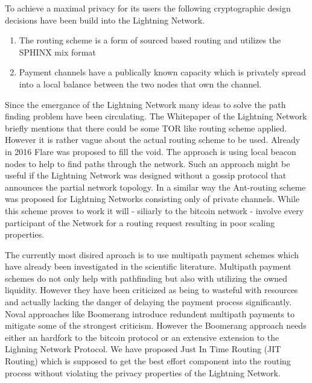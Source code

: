 \documentclass[a4paper,latin]{paper}
\begin{document}
To achieve a maximal privacy for its users the following cryptographic design decisions have been build into the Lightning Network.
\begin{enumerate}
\item The routing scheme is a form of sourced based routing and utilizes the SPHINX mix format \cite{danezis2009sphinx}
\item Payment channels have a publically known capacity which is privately spread into a local balance between the two nodes that own the channel.
\end{enumerate}

Since the emergance of the Lightning Network many ideas to solve the path finding problem have been circulating.
The Whitepaper of the Lightning Network \cite{poon2016bitcoin} briefly mentions that there could be some TOR like routing scheme applied.
However it is rather vague about the actual routing scheme to be used.
Already in 2016 Flare \cite{prihodko2016flare} was proposed to fill the void.
The approach is using local beacon nodes to help to find paths through the network.
Such an approach might be useful if the Lightning Network was designed without a gossip protocol that announces the partial network topology.
In a similar way the Ant-routing scheme \cite{grunspan2018ant} was proposed for Lightning Networks consisting only of private channels.
While this scheme proves to work it will - siliarly to the bitcoin network - involve every participant of the Network for a routing request resulting in poor scaling properties.

The currently most disired aproach is to use multipath payment schemes \cite{osuntokun2018AMP} which have already been investigated \cite{piatkivskyi2018split} in the scientific literature.
Multipath payment schemes do not only help with pathfinding but also with utilizing the owned liquidity.
However they have been criticized \cite{pickhardt2019pathfinding} as being to wasteful with resources and actually lacking the danger of delaying the payment process significantly.
Noval approaches like Boomerang \cite{bagaria2019boomerang} introduce redundent multipath payments to mitigate some of the strongest criticism.
However the Boomerang approach needs either an hardfork to the bitcoin protocol or an extensive extension to the Lighning Network Protocol. 
We have proposed Just In Time Routing (JIT Routing) \cite{pickhardt2019jit} which is supposed to get the best effort component into the routing process without violating the privacy properties of the Lightning Network.
\end{document}
